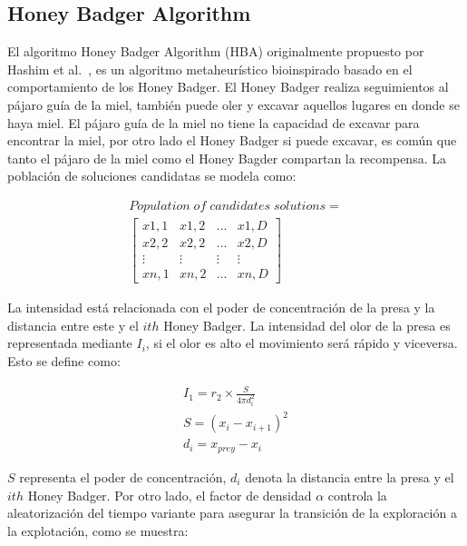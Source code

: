 \documentclass[conference]{IEEEtran}
\begin{document}
\subsection{Honey Badger Algorithm}

\noindent El algoritmo Honey Badger Algorithm (HBA) originalmente propuesto por Hashim et al.~\cite{Hashim2022}, es un algoritmo metaheurístico bioinspirado basado en el comportamiento de los Honey Badger. El Honey Badger realiza seguimientos al pájaro guía de la miel, también puede oler y excavar aquellos lugares en donde se haya miel. El pájaro guía de la miel no tiene la capacidad de excavar para encontrar la miel, por otro lado el Honey Badger si puede excavar, es común que tanto el pájaro de la miel como el Honey Bagder compartan la recompensa. La población de soluciones candidatas se modela como:

\begin{equation}
\begin{gathered}
Population \;of\; candidates\; solutions=\\\begin{bmatrix}
  x1,1 & x1,2 & ... & x1,D  \\
  x2,2 & x2,2 & ... & x2,D  \\
  \vdots & \vdots & \vdots & \vdots \\
  xn,1 & xn,2 & ... & xn,D
\end{bmatrix}
\end{gathered}
\label{eq27}
\end{equation}

\noindent La intensidad está relacionada con el poder de concentración de la presa y la distancia entre este y el $ith$ Honey Badger. La intensidad del olor de la presa es representada mediante $I_i$, si el olor es alto el movimiento será rápido y viceversa. Esto se define como:

\begin{equation}
\begin{gathered}
I_1 = r_2 \times \frac{S}{4 \pi d_i^2}\\
S = (x_i -x_{i+1})^2\\
d_i = x_{prey} - x_i
\end{gathered}
\label{eq28}
\end{equation}

\noindent $S$ representa el poder de concentración, $d_i$ denota la distancia entre la presa y el $ith$ Honey Badger. Por otro lado, el factor de densidad $\alpha$ controla la aleatorización del tiempo variante para asegurar la transición de la exploración a la explotación, como se muestra:
\end{document}
